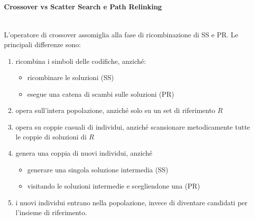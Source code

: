 \documentclass{article}
\begin{document}
\paragraph{Crossover vs Scatter Search e Path Relinking}\mbox{}\\
L'operatore di crossover assomiglia alla fase di ricombinazione di SS e PR. Le
principali differenze sono:
\begin{enumerate}
    \item ricombina i simboli delle codifiche, anziché:
    \begin{itemize}
        \item ricombinare le soluzioni (SS)
        \item esegue una catena di scambi sulle soluzioni (PR)
    \end{itemize}
    \item opera sull'intera popolazione, anziché solo su un set di riferimento $R$
    \item opera su coppie casuali di individui, anziché scansionare metodicamente tutte le
    coppie di soluzioni di $R$
    \item genera una coppia di nuovi individui, anziché
    \begin{itemize}
        \item generare una singola soluzione intermedia (SS)
        \item visitando le soluzioni intermedie e scegliendone una (PR)
    \end{itemize}
    \item i nuovi individui entrano nella popolazione, invece di diventare candidati per
    l'insieme di riferimento.
\end{enumerate}
\end{document}
